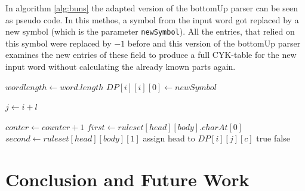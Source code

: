 \documentclass[a4paper, 11pt]{article}
\begin{document}
In algorithm \ref{alg:buns} the adapted version of the bottomUp parser can be seen as pseudo code. In this methos, a symbol from the input word got replaced by a new symbol (which is the parameter \texttt{newSymbol}). All the entries, that relied on this symbol were replaced by $-1$ before and this version of the bottomUp parser examines the new entries of these field to produce a full CYK-table for the new input word without calculating the already known parts again.


\begin{center}
\label{alg:buns}
\begin{algorithmic}[1]
\State $wordlength \gets word.length$ 
\State $DP[i][i][0] \gets newSymbol$
\EndIf
\EndFor

\State $j \gets i + l$

\State $conter \gets counter + 1$
\State $first \gets ruleset[head][body].charAt[0]$
\State $second \gets ruleset[head][body][1]$
\State assign head to $DP[i][j][c]$
\EndIf
\EndIf
\EndFor
\EndFor
\EndFor
\EndIf
\EndFor
\EndFor
{}
\State \Return true
\EndIf
\State \Return false
\end{algorithmic}
\hrulefill
\end{center}














\newpage

\section{Conclusion and Future Work}
\label{conclusion}
\end{document}
